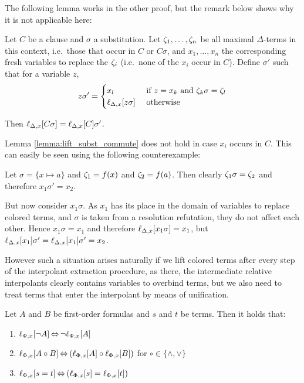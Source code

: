 \documentclass[,%
	paper=a4,%
	DIV12, %
	twoside=false,%
	liststotoc,
	bibtotoc,
	draft=false,%
	numbers=noendperiod
]{scrartcl}
\begin{document}
The following lemma works in the other proof, but the remark below shows why it is not applicable here:

\begin{lemma} 
	\label{lemma:lift_subst_commute}
	Let $C$ be a clause and $\sigma$ a substitution.
	Let $\colterm{1},\ldots,\colterm{n}$ be all maximal $\Delta$-terms in this context, i.e.\ those that occur in $C$ or $C\sigma$,  and
	$x_1, \ldots, x_n$ the corresponding fresh variables to replace the $\colterm{i}$ (i.e.~none of the $x_i$ occur in $C$).
	Define $\sigma'$ such that for a variable $z$,
	\[
		z \sigma' =
		\begin{cases} 
			x_l & \text{ if } z = x_k \text{ and } \colterm{k}\sigma = \colterm{l}  \\
			\lif{z\sigma} & \text{ otherwise}
		\end{cases} 
	\]

	Then
	$\lif{C\sigma} =
	\lif{C}\sigma'$.
\end{lemma}

\begin{remark}
	Lemma \ref{lemma:lift_subst_commute} does not hold in case $x_i$ occurs in $C$.
	This can easily be seen using the following counterexample:


	Let $\sigma = \{x \mapsto a\}$ and $\colterm{1} = f(x)$ and $\colterm{2} = f(a)$. 
	Then clearly $\colterm{1}\sigma = \colterm{2}$ and therefore $x_1\sigma' = x_2$.

	But now consider $x_1 \sigma$. 
	As $x_1$ has its place in the domain of variables to replace colored terms, and $\sigma$ is taken from a resolution refutation, they do not affect each other. 
	Hence $x_1\sigma = x_1$ and therefore $\lifdelta{x_1\sigma} = x_1$, but $\lifdelta{x_1}\sigma' = \lifdelta{x_1}\sigma' = x_2$.


	However such a situation arises naturally if we lift colored terms after every step of the interpolant extraction procedure, as there, the intermediate relative interpolants clearly contains variables to overbind terms, but we also need to treat terms that enter the interpolant by means of unification.
\end{remark}

\begin{lemma}
	\label{lemma:lift_logic_commute}
	Let $A$ and $B$ be first-order formulas and $s$ and $t$ be terms. Then it holds that:
	\begin{enumerate}
		\item $\lift{\Phi}{\lnot A}{x} \semiff{} \lnot \lift{\Phi}{A}{x}$
		\item $\lift{\Phi}{A \circ B}{x} \semiff{} ( \lift{\Phi}{A}{x} \circ \lift{\Phi}{B}{x} )$ for  $\circ \in     \{\land, \lor\}$
		\item $\lift{\Phi}{s = t}{x} \semiff{} ( \lift{\Phi}{s}{x} = \lift{\Phi}{t}{x} )$
	\end{enumerate}
\end{lemma}
\end{document}
